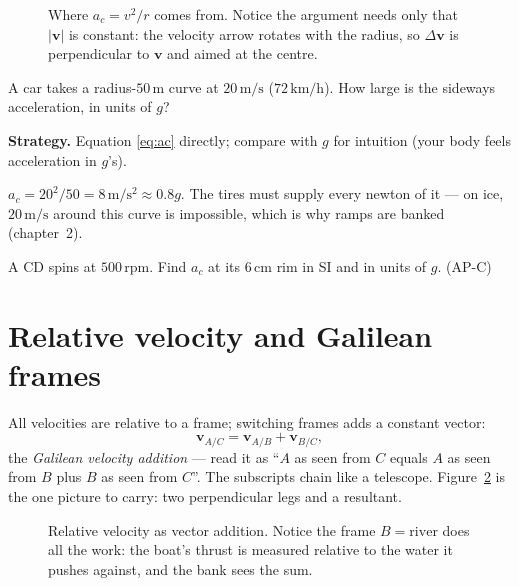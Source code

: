 \begin{figure}[htbp]\centering

\caption{Where $a_c=v^{2}/r$ comes from. Notice the argument needs only that
$|\mathbf v|$ is constant: the velocity arrow rotates with the radius, so
$\Delta\mathbf v$ is perpendicular to $\mathbf v$ and aimed at the centre.}
\label{fig:centripetal}
\end{figure}

\begin{example}\label{ex:circular}
A car takes a radius-$50\,\mathrm{m}$ curve at $20\,\mathrm{m/s}$
($72\,\mathrm{km/h}$). How large is the sideways acceleration, in units of
$g$?
\par\smallskip
\textbf{Strategy.} Equation \eqref{eq:ac} directly; compare with $g$ for
intuition (your body feels acceleration in $g$'s).
\begin{solution}
$a_c=20^{2}/50=8\,\mathrm{m/s^{2}}\approx0.8g$. The tires must supply every
newton of it --- on ice, $20\,\mathrm{m/s}$ around this curve is impossible,
which is why ramps are banked (chapter~2). \checkmark
\end{solution}
\end{example}

\begin{exercise}[medium]
A CD spins at $500\,\mathrm{rpm}$. Find $a_c$ at its $6\,\mathrm{cm}$ rim in
SI and in units of $g$. (AP-C)
\end{exercise}

\section{Relative velocity and Galilean frames}\label{sec:kin-rel}

All velocities are relative to a frame; switching frames adds a constant
vector:
\[
  \mathbf v_{A/C}=\mathbf v_{A/B}+\mathbf v_{B/C},
\]
the \emph{Galilean velocity addition} --- read it as
``$A$ as seen from $C$ equals $A$ as seen from $B$ plus $B$ as seen from
$C$''. The subscripts chain like a telescope. Figure~\ref{fig:reltri} is the
one picture to carry: two perpendicular legs and a resultant.

\begin{figure}[htbp]\centering

\caption{Relative velocity as vector addition. Notice the frame
$B=\mathrm{river}$ does all the work: the boat's thrust is measured relative
to the water it pushes against, and the bank sees the sum.}
\label{fig:reltri}
\end{figure}

